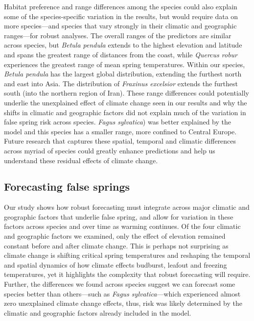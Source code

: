 \documentclass{article}\usepackage[]{graphicx}\usepackage[]{color}
\begin{document}
Habitat preference and range differences among the species could also explain some of the species-specific variation in the results, but would require data on more species---and species that vary strongly in their climatic and geographic ranges---for robust analyses. The overall ranges of the predictors are similar across species, but \textit{Betula pendula} extends to the highest elevation and latitude and spans the greatest range of distances from the coast, while \textit{Quercus robur} experiences the greatest range of mean spring temperatures. Within our species, \textit{Betula pendula} has the largest global distribution, extending the furthest north and east into Asia. The distribution of \textit{Fraxinus excelsior} extends the furthest south (into the northern region of Iran). These range differences could potentially underlie the unexplained effect of climate change seen in our results and why the shifts in climatic and geographic factors did not explain much of the variation in false spring risk across species. \textit{Fagus sylvatica}) was better explained by the model and this species has a smaller range, more confined to Central Europe. Future research that captures these spatial, temporal and climatic differences across myriad of species could greatly enhance predictions and help us understand these residual effects of climate change.  

\subsection*{Forecasting false springs}
Our study shows how robust forecasting must integrate across major climatic and geographic factors that underlie false spring, and allow for variation in these factors across species and over time as warming continues. Of the four climatic and geographic factors we examined, only the effect of elevation remained constant before and after climate change. This is perhaps not surprising as climate change is shifting critical spring temperatures and reshaping the temporal and spatial dynamics of how climate effects budburst, leafout and freezing temperatures, yet it highlights the complexity that robust forecasting will require. Further, the differences we found across species suggest we can forecast some species better than others---such as \textit{Fagus sylvatica}---which experienced almost zero unexplained climate change effects, thus, risk was likely determined by the climatic and geographic factors already included in the model. %
\end{document}
